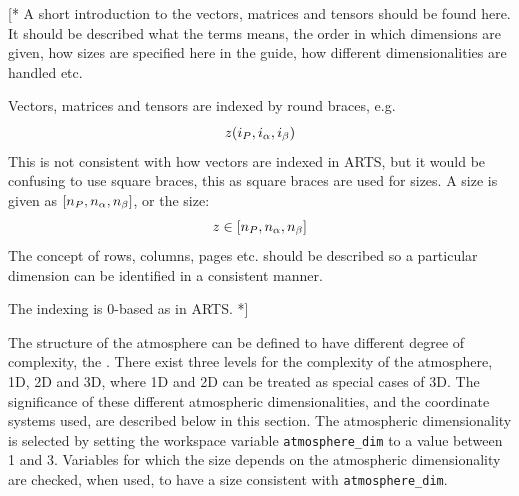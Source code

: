 \label{sec:fm_defs:math}

[* A short introduction to the vectors, matrices and tensors should be
found here. It should be described what the terms means, the order in
which dimensions are given, how sizes are specified here in the guide,
how different dimensionalities are handled etc. 

Vectors, matrices and tensors are indexed by round braces, e.g.
\begin{equation}
  z(i_{P},i_{\alpha},i_{\beta})
\end{equation}
This is not consistent with how vectors are indexed in ARTS, but it
would be confusing to use square braces, this as square braces are
used for sizes. A size is given as $
[n_{P},n_{\alpha},n_{\beta}]$, or the size:
\begin{equation}
  z \in [n_{P},n_{\alpha},n_{\beta}]
\end{equation}
The concept of rows, columns, pages etc. should be described so a
particular dimension can be identified in a consistent manner.

The indexing is 0-based as in ARTS. *]



\label{sec:fm_defs:atmosphere}


\label{sec:fm_defs:atmdim}

The structure of the atmosphere can be defined to have different
degree of complexity, the . There
exist three levels for the complexity of the atmosphere, 1D, 2D and
3D, where 1D and 2D can be treated as special cases of 3D. The
significance of these different atmospheric dimensionalities, and the
coordinate systems used, are described below in this section. The
atmospheric dimensionality is selected by setting the workspace
variable \verb|atmosphere_dim| to a value between 1 and 3. Variables
for which the size depends on the atmospheric dimensionality are
checked, when used, to have a size consistent with
\verb|atmosphere_dim|.

